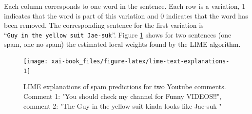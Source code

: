 \documentclass[12pt,]{krantz}
\theoremstyle{definition}
\theoremstyle{definition}
\theoremstyle{definition}
\theoremstyle{remark}
\begin{document}
Each column corresponds to one word in the sentence. Each row is a
variation, 1 indicates that the word is part of this variation and 0
indicates that the word has been removed. The corresponding sentence for
the first variation is ``\texttt{Guy\ in\ the\ yellow\ suit\ Jae-suk}''.
Figure \ref{fig:lime-text-explanations} shows for two sentences (one
spam, one no spam) the estimated local weights found by the LIME
algorithm.

\begin{figure}

{\centering \texttt{[image: xai-book\_files/figure-latex/lime-text-explanations-1]} 

}

\caption{LIME explanations of spam predictions for two Youtube comments. Comment 1: "You should check my channel for Funny VIDEOS!!", comment 2: "The Guy in the yellow suit kinda looks like Jae-suk "}\label{fig:lime-text-explanations}
\end{figure}



\backmatter
\end{document}
